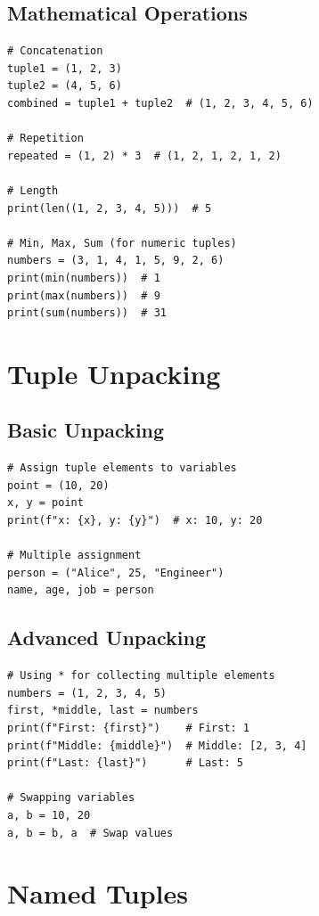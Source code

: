 \documentclass[12pt,a4paper]{article}
\begin{document}
\subsection{Mathematical Operations}

\begin{lstlisting}
# Concatenation
tuple1 = (1, 2, 3)
tuple2 = (4, 5, 6)
combined = tuple1 + tuple2  # (1, 2, 3, 4, 5, 6)

# Repetition
repeated = (1, 2) * 3  # (1, 2, 1, 2, 1, 2)

# Length
print(len((1, 2, 3, 4, 5)))  # 5

# Min, Max, Sum (for numeric tuples)
numbers = (3, 1, 4, 1, 5, 9, 2, 6)
print(min(numbers))  # 1
print(max(numbers))  # 9
print(sum(numbers))  # 31
\end{lstlisting}

\section{Tuple Unpacking}

\subsection{Basic Unpacking}

\begin{lstlisting}
# Assign tuple elements to variables
point = (10, 20)
x, y = point
print(f"x: {x}, y: {y}")  # x: 10, y: 20

# Multiple assignment
person = ("Alice", 25, "Engineer")
name, age, job = person
\end{lstlisting}

\subsection{Advanced Unpacking}

\begin{lstlisting}
# Using * for collecting multiple elements
numbers = (1, 2, 3, 4, 5)
first, *middle, last = numbers
print(f"First: {first}")    # First: 1
print(f"Middle: {middle}")  # Middle: [2, 3, 4]
print(f"Last: {last}")      # Last: 5

# Swapping variables
a, b = 10, 20
a, b = b, a  # Swap values
\end{lstlisting}

\section{Named Tuples}
\end{document}
